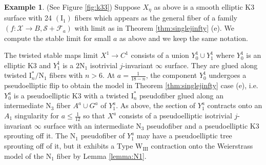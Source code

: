 \documentclass[11pt]{amsart}
\theoremstyle{definition}
\newtheorem{example}[theorem]{Example}
\theoremstyle{remark}
\begin{document}
	
	\begin{example}\label{ex:2}(See Figure \ref{fig:k33})
		Suppose $X_{\eta}$ as above is a smooth elliptic K3 surface with 24 $(\mathrm{I}_1)$ fibers which appears as the general fiber of a family $(f : \mathscr{X} \to B, \mathscr{S} + \mathscr{F}_a)$ with limit as in Theorem \ref{thm:singlejinfty} (e). We compute the stable limit for small $a$ as above and we keep the same notation. 
		
		The twisted stable maps limit $X^1\to C^1$ consists of a union $Y_{0}^1 \cup Y_{1}^1$ where $Y_{0}^1$ is an elliptic K3 and $Y_{1}^1$ is a $2\mathrm{N}_1$ isotrivial $j$-invariant $\infty$ surface. They are glued along twisted $\mathrm{I}_n^*/\mathrm{N}_1$ fibers with $n > 6$. At $a = \frac{1}{18 - n}$, the component $Y_{0}^1$ undergoes a pseudoelliptic flip to obtain the model in Theorem \ref{thm:singlejinfty} case (e), i.e. $Y_0^a$ is a pseudoelliptic K3 with a twisted $\mathrm{I}_n^*$ pseudofiber glued along an intermediate $\mathrm{N}_3$ fiber $A^a \cup G^a$ of $Y_{1}^a$. As above, the section of $Y_1^a$ contracts onto an $A_1$ singularity for $a \le \frac{1}{12}$  so that $X^a$ consists of a pseudoelliptic isotrivial $j$-invariant $\infty$ surface with an intermediate $\mathrm{N}_3$ pseudofiber and a pseudoelliptic K3 sprouting off it. The $\mathrm{N}_1$ pseudofiber of $Y_1^a$ may have a pseudoelliptic tree sprouting off of it, but it exhibits a Type $\mathrm{W}_\mathrm{III}$ contraction onto the Weierstrass model of the $\mathrm{N}_1$ fiber by Lemma \ref{lemma:N1}. 
		

\end{example}
\end{document}
